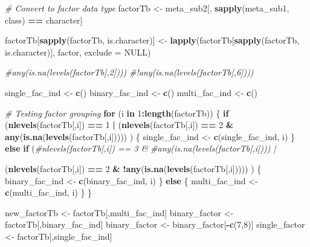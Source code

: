 \documentclass[
]{article}
\newenvironment{Shaded}{\begin{snugshade}}{\end{snugshade}}
\newcommand{\AttributeTok}[1]{\textcolor[rgb]{0.13,0.29,0.53}{#1}}
\newcommand{\CommentTok}[1]{\textcolor[rgb]{0.56,0.35,0.01}{\textit{#1}}}
\newcommand{\ConstantTok}[1]{\textcolor[rgb]{0.56,0.35,0.01}{#1}}
\newcommand{\ControlFlowTok}[1]{\textcolor[rgb]{0.13,0.29,0.53}{\textbf{#1}}}
\newcommand{\DecValTok}[1]{\textcolor[rgb]{0.00,0.00,0.81}{#1}}
\newcommand{\FunctionTok}[1]{\textcolor[rgb]{0.13,0.29,0.53}{\textbf{#1}}}
\newcommand{\NormalTok}[1]{#1}
\newcommand{\OtherTok}[1]{\textcolor[rgb]{0.56,0.35,0.01}{#1}}
\newcommand{\SpecialCharTok}[1]{\textcolor[rgb]{0.81,0.36,0.00}{\textbf{#1}}}
\newcommand{\StringTok}[1]{\textcolor[rgb]{0.31,0.60,0.02}{#1}}
\begin{document}
\begin{Shaded}
\begin{Highlighting}[]
\CommentTok{\# Convert to factor data type}
\NormalTok{factorTb }\OtherTok{\textless{}{-}}\NormalTok{ meta\_sub2[, }\FunctionTok{sapply}\NormalTok{(meta\_sub1, class) }\SpecialCharTok{==} \StringTok{\textquotesingle{}character\textquotesingle{}}\NormalTok{]}

\NormalTok{factorTb[}\FunctionTok{sapply}\NormalTok{(factorTb, is.character)] }\OtherTok{\textless{}{-}} \FunctionTok{lapply}\NormalTok{(factorTb[}\FunctionTok{sapply}\NormalTok{(factorTb, is.character)], factor, }\AttributeTok{exclude =} \ConstantTok{NULL}\NormalTok{)}

\CommentTok{\#any(is.na(levels(factorTb[,2])))}
\CommentTok{\#!any(is.na(levels(factorTb[,6])))}

\NormalTok{single\_fac\_ind }\OtherTok{\textless{}{-}} \FunctionTok{c}\NormalTok{()}
\NormalTok{binary\_fac\_ind }\OtherTok{\textless{}{-}} \FunctionTok{c}\NormalTok{()}
\NormalTok{multi\_fac\_ind }\OtherTok{\textless{}{-}} \FunctionTok{c}\NormalTok{()}

\CommentTok{\# Testing factor grouping}
\ControlFlowTok{for}\NormalTok{ (i }\ControlFlowTok{in} \DecValTok{1}\SpecialCharTok{:}\FunctionTok{length}\NormalTok{(factorTb)) \{}
  \ControlFlowTok{if}\NormalTok{ (}\FunctionTok{nlevels}\NormalTok{(factorTb[,i]) }\SpecialCharTok{==} \DecValTok{1} \SpecialCharTok{|} 
\NormalTok{      (}\FunctionTok{nlevels}\NormalTok{(factorTb[,i]) }\SpecialCharTok{==} \DecValTok{2} \SpecialCharTok{\&} 
       \FunctionTok{any}\NormalTok{(}\FunctionTok{is.na}\NormalTok{(}\FunctionTok{levels}\NormalTok{(factorTb[,i]))))}
\NormalTok{      ) \{}
\NormalTok{    single\_fac\_ind }\OtherTok{\textless{}{-}} \FunctionTok{c}\NormalTok{(single\_fac\_ind, i)}
\NormalTok{  \} }\ControlFlowTok{else} \ControlFlowTok{if}\NormalTok{ (}\CommentTok{\#nlevels(factorTb[,i]) == 3 \& }
             \CommentTok{\#any(is.na(levels(factorTb[,i]))) |}
             
\NormalTok{             (}\FunctionTok{nlevels}\NormalTok{(factorTb[,i]) }\SpecialCharTok{==} \DecValTok{2} \SpecialCharTok{\&} 
              \SpecialCharTok{!}\FunctionTok{any}\NormalTok{(}\FunctionTok{is.na}\NormalTok{(}\FunctionTok{levels}\NormalTok{(factorTb[,i]))))}
\NormalTok{          ) \{}
\NormalTok{    binary\_fac\_ind }\OtherTok{\textless{}{-}} \FunctionTok{c}\NormalTok{(binary\_fac\_ind, i)}
\NormalTok{  \} }\ControlFlowTok{else}\NormalTok{ \{}
\NormalTok{    multi\_fac\_ind }\OtherTok{\textless{}{-}} \FunctionTok{c}\NormalTok{(multi\_fac\_ind, i)}
\NormalTok{  \}}
\NormalTok{\}}

\NormalTok{new\_factorTb }\OtherTok{\textless{}{-}}\NormalTok{ factorTb[,multi\_fac\_ind]}
\NormalTok{binary\_factor }\OtherTok{\textless{}{-}}\NormalTok{ factorTb[,binary\_fac\_ind]}
\NormalTok{binary\_factor }\OtherTok{\textless{}{-}}\NormalTok{ binary\_factor[}\SpecialCharTok{{-}}\FunctionTok{c}\NormalTok{(}\DecValTok{7}\NormalTok{,}\DecValTok{8}\NormalTok{)]}
\NormalTok{single\_factor }\OtherTok{\textless{}{-}}\NormalTok{ factorTb[,single\_fac\_ind]}
\end{Highlighting}
\end{Shaded}
\end{document}
